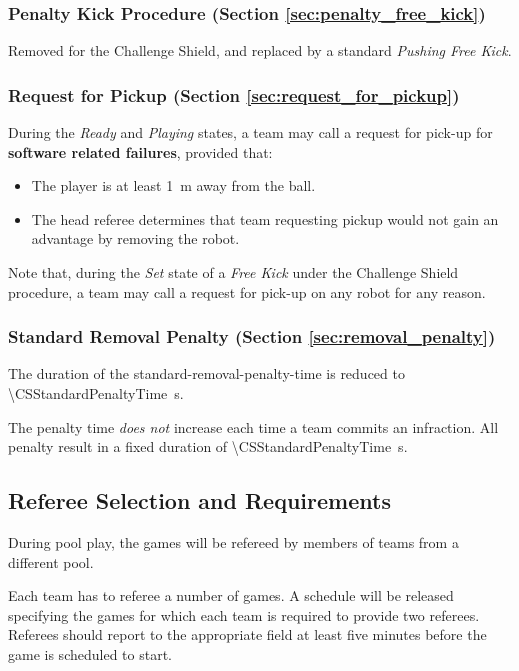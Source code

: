 \subsubsection{Penalty Kick Procedure (Section \ref{sec:penalty_free_kick})}

Removed for the Challenge Shield, and replaced by a standard \emph{Pushing Free Kick}.

\subsubsection{Request for Pickup (Section \ref{sec:request_for_pickup})}

During the \emph{Ready} and \emph{Playing} states, a team may call a request for pick-up for \textbf{software related failures}, provided that:
\begin{itemize}
    \item The player is at least \qty{1}{\meter} away from the ball.
    \item The head referee determines that team requesting pickup would not gain an advantage by removing the robot.
\end{itemize}

Note that, during the \emph{Set} state of a \emph{Free Kick} under the Challenge Shield procedure, a team may call a request for pick-up on any robot for any reason.

\subsubsection{Standard Removal Penalty (Section \ref{sec:removal_penalty})}

The duration of the standard-removal-penalty-time is reduced to \qty{\CSStandardPenaltyTime}{\second}.

The penalty time \emph{does not} increase each time a team commits an infraction. All penalty result in a fixed duration of \qty{\CSStandardPenaltyTime}{\second}.

\subsection{Referee Selection and Requirements}
\label{sec:refSelection}
During pool play, the games will be refereed by members of teams from a different pool.

Each team has to referee a number of games. A schedule will be released specifying the games for which each team is required to provide two referees. Referees should report to the appropriate field at least five minutes before the game is scheduled to start.


